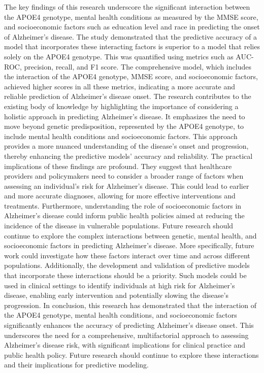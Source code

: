 \documentclass[conference]{IEEEtran}
\begin{document}
The key findings of this research underscore the significant interaction between the APOE4 genotype, mental health conditions as measured by the MMSE score, and socioeconomic factors such as education level and race in predicting the onset of Alzheimer's disease. The study demonstrated that the predictive accuracy of a model that incorporates these interacting factors is superior to a model that relies solely on the APOE4 genotype. This was quantified using metrics such as AUC-ROC, precision, recall, and F1 score. The comprehensive model, which includes the interaction of the APOE4 genotype, MMSE score, and socioeconomic factors, achieved higher scores in all these metrics, indicating a more accurate and reliable prediction of Alzheimer's disease onset. The research contributes to the existing body of knowledge by highlighting the importance of considering a holistic approach in predicting Alzheimer's disease. It emphasizes the need to move beyond genetic predisposition, represented by the APOE4 genotype, to include mental health conditions and socioeconomic factors. This approach provides a more nuanced understanding of the disease's onset and progression, thereby enhancing the predictive models' accuracy and reliability. The practical implications of these findings are profound. They suggest that healthcare providers and policymakers need to consider a broader range of factors when assessing an individual's risk for Alzheimer's disease. This could lead to earlier and more accurate diagnoses, allowing for more effective interventions and treatments. Furthermore, understanding the role of socioeconomic factors in Alzheimer's disease could inform public health policies aimed at reducing the incidence of the disease in vulnerable populations. Future research should continue to explore the complex interactions between genetic, mental health, and socioeconomic factors in predicting Alzheimer's disease. More specifically, future work could investigate how these factors interact over time and across different populations. Additionally, the development and validation of predictive models that incorporate these interactions should be a priority. Such models could be used in clinical settings to identify individuals at high risk for Alzheimer's disease, enabling early intervention and potentially slowing the disease's progression. In conclusion, this research has demonstrated that the interaction of the APOE4 genotype, mental health conditions, and socioeconomic factors significantly enhances the accuracy of predicting Alzheimer's disease onset. This underscores the need for a comprehensive, multifactorial approach to assessing Alzheimer's disease risk, with significant implications for clinical practice and public health policy. Future research should continue to explore these interactions and their implications for predictive modeling.
\end{document}

